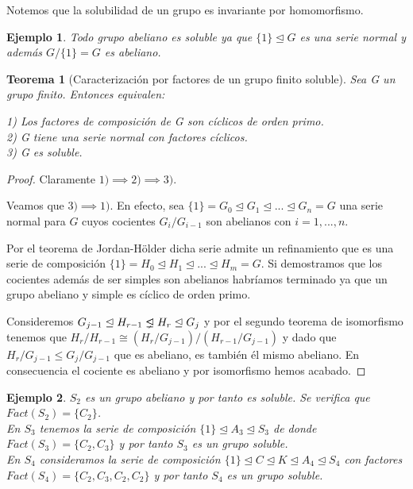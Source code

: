 \documentclass{article}
\theoremstyle{theorem-style}  %
\newtheorem{theorem}{Teorema}[section]  %
\theoremstyle{definition-style}
\theoremstyle{example-style}
\newtheorem{example}{Ejemplo}[section]
\newcommand{\propernormal}{%
  \mathrel{\ooalign{$\lneq$\cr\raise.22ex\hbox{$\lhd$}\cr}}}
\begin{document}
Notemos que la solubilidad de un grupo es invariante por homomorfismo.

\begin{example}
Todo grupo abeliano es soluble ya que $\{1\} \trianglelefteq G$ es una serie normal y además $G/\{1\} = G$ es abeliano.
\end{example}

\begin{theorem}[Caracterización por factores de un grupo finito soluble]
Sea G un grupo finito. Entonces equivalen:

1) Los factores de composición de G son cíclicos de orden primo.\\
2) G tiene una serie normal con factores cíclicos.\\
3) G es soluble.
\end{theorem}
\begin{proof}
Claramente $1) \implies 2) \implies 3)$.

Veamos que $3) \implies 1)$. En efecto, sea $\{1\} = G_0 \trianglelefteq G_1 \trianglelefteq ... \trianglelefteq G_n = G$ una serie normal para $G$ cuyos cocientes $G_i/G_{i-1}$ son abelianos con $i = 1, ... ,n$.

Por el teorema de Jordan-Hölder dicha serie admite un refinamiento que es una serie de composición $\{1\} = H_0 \trianglelefteq H_1 \trianglelefteq ... \trianglelefteq H_m = G$. Si demostramos que los cocientes además de ser simples son abelianos habríamos terminado ya que un grupo abeliano y simple es cíclico de orden primo. 

Consideremos $G_{j-1} \trianglelefteq H_{r-1} \propernormal H_{r} \trianglelefteq G_{j}$ y por el segundo teorema de isomorfismo tenemos que $H_r/H_{r-1} \cong (H_r/G_{j-1})/(H_{r-1}/G_{j-1})$ y dado que $H_r/G_{j-1} \le G_j/G_{j-1}$ que es abeliano, es también él mismo abeliano. En consecuencia el cociente es abeliano y por isomorfismo hemos acabado.
\end{proof}

\begin{example}
$S_2$ es un grupo abeliano y por tanto es soluble. Se verifica que $Fact(S_2) = \{C_2\}$.\\
En $S_3$ tenemos la serie de composición $\{1\} \trianglelefteq A_3 \trianglelefteq S_3$ de donde $Fact(S_3) = \{C_2,C_3\}$ y por tanto $S_3$ es un grupo soluble.\\
En $S_4$ consideramos la serie de composición $\{1\} \trianglelefteq C \trianglelefteq K \trianglelefteq A_4 \trianglelefteq S_4$ con factores $Fact(S_4) = \{C_2,C_3,C_2,C_2\}$ y por tanto $S_4$ es un grupo soluble.
\end{example}
\end{document}
